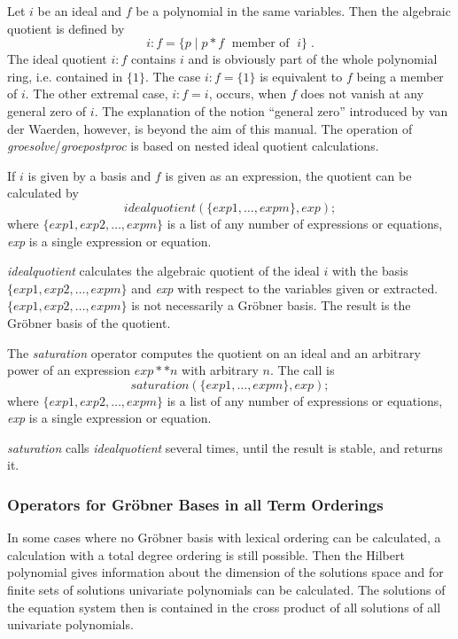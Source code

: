  
\hypertarget{operator:IDEAL_QUOTIENT}{}
Let $i$ be an ideal and $f$ be a polynomial in the same
variables. Then the algebraic quotient is defined by
\[
i:f = \{ p \;| \; p * f \;\mbox{    member of }\; i\}\;.
\]
The ideal quotient $i:f$ contains $i$ and is obviously part of the
whole polynomial ring, i.e. contained in $\{1\}$. The case $i:f =
\{1\}$ is equivalent to $f$ being a member of  $i$. The other extremal
case, $i:f=i$, occurs, when $f$ does not vanish at any general zero of $i$.
The explanation of the notion ``general zero'' introduced by van der
Waerden, however, is beyond the aim of this manual. The operation
of \emph{groesolve}/\emph{groepostproc} is based on nested ideal quotient
calculations.

If $i$ is given by a basis and $f$ is given as an expression, the
quotient can be calculated by
\[
idealquotient (\{exp1, \ldots , expm\}, exp); \]
where $\{exp1, exp2, \ldots , expm\}$ is a list of any number of
expressions or equations, {\it exp} is a single expression or equation.

\emph{idealquotient} calculates the algebraic quotient of the ideal $i$
with the basis  $\{exp1, exp2, \ldots , expm\}$ and {\it exp} with
respect to  the variables given or extracted.  $\{exp1, exp2, \ldots ,
expm\}$ is not necessarily a Gr\"obner basis.
The result is the Gr\"obner basis of the quotient.

\hypertarget{operator:SATURATION}{}
The \emph{saturation} operator computes the quotient on an ideal and an arbitrary power
of an expression $exp**n$ with arbitrary $n$. The call is
\[ saturation (\{exp1, \ldots , expm\}, exp); \]
where $\{exp1, exp2, \ldots , expm\}$ is a list of any number of
expressions or equations, {\it exp} is a single expression or equation.

\emph{saturation} calls \emph{idealquotient} several times, until the result is
stable, and returns it.

\subsubsection{Operators for Gr\"obner Bases in all Term Orderings}
In some cases where no Gr\"obner
basis with lexical ordering can be calculated, a calculation with a total
degree ordering is still possible. Then the Hilbert polynomial gives
information about the dimension of the solutions space and for finite
sets of solutions univariate polynomials can be calculated. The solutions
of the equation system then is contained in the cross product of all
solutions of all univariate polynomials.

